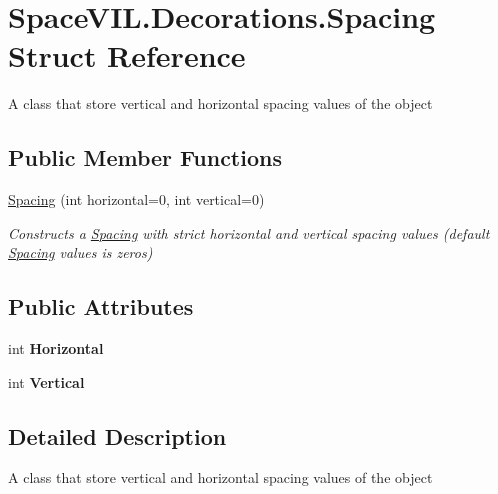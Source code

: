\hypertarget{struct_space_v_i_l_1_1_decorations_1_1_spacing}{}\section{Space\+V\+I\+L.\+Decorations.\+Spacing Struct Reference}
\label{struct_space_v_i_l_1_1_decorations_1_1_spacing}


A class that store vertical and horizontal spacing values of the object  


\subsection*{Public Member Functions}
\begin{DoxyCompactItemize}
\item 
\mbox{\hyperlink{struct_space_v_i_l_1_1_decorations_1_1_spacing_aef752609b39f6b9c34545edff478fbb6}{Spacing}} (int horizontal=0, int vertical=0)
\begin{DoxyCompactList}\small\item\em Constructs a \mbox{\hyperlink{struct_space_v_i_l_1_1_decorations_1_1_spacing}{Spacing}} with strict horizontal and vertical spacing values (default \mbox{\hyperlink{struct_space_v_i_l_1_1_decorations_1_1_spacing}{Spacing}} values is zeros) \end{DoxyCompactList}\end{DoxyCompactItemize}
\subsection*{Public Attributes}
\begin{DoxyCompactItemize}
\item 
\mbox{\label{struct_space_v_i_l_1_1_decorations_1_1_spacing_aa60b104bcc5475c9dfa60c4d5a77b668}} 
int {\bfseries Horizontal}
\item 
\mbox{\label{struct_space_v_i_l_1_1_decorations_1_1_spacing_ab648e380115bb39dccdd9cc4dc47456e}} 
int {\bfseries Vertical}
\end{DoxyCompactItemize}


\subsection{Detailed Description}
A class that store vertical and horizontal spacing values of the object 



